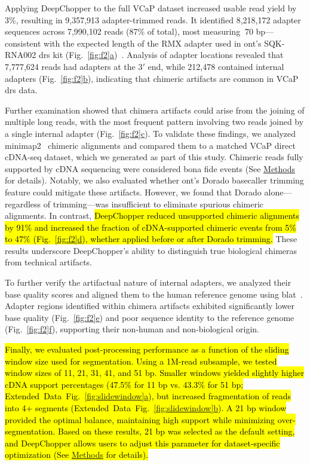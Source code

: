 \documentclass[pdflatex,sn-nature, lineno]{sn-jnl}%
\newcommand{\figref}[2]{Fig.~\hyperref[#1]{\ref*{#1}#2}}
\newcommand{\edfigref}[2]{Extended Data Fig.~\hyperref[#1]{\ref*{#1}#2}}
\begin{document}
Applying DeepChopper to the full VCaP dataset increased usable read yield by 3\%, resulting in 9,357,913 adapter-trimmed reads. It identified 8,218,172 adapter sequences across 7,990,102 reads (87\% of total), most measuring $~70$ bp—consistent with the expected length of the RMX adapter used in \gls{ont}'s SQK-RNA002 \gls{drs} kit (\figref{fig:f2}{a})~\cite{nano2017tech}. Analysis of adapter locations revealed that 7,777,624 reads had adapters at the $3'$ end, while 212,478 contained internal adapters (\figref{fig:f2}{b}), indicating that chimeric artifacts are common in VCaP \gls{drs} data.

Further examination showed that chimera artifacts could arise from the joining of multiple long reads, with the most frequent pattern involving two reads joined by a single internal adapter (\figref{fig:f2}{c}). To validate these findings, we analyzed minimap2~\cite{li2018minimap2} chimeric alignments and compared them to a matched VCaP direct cDNA-seq dataset, which we generated as part of this study. Chimeric reads fully supported by cDNA sequencing were considered bona fide events (See \hyperref[sec:methods]{Methods} for details). Notably, we also evaluated whether \gls{ont}'s Dorado basecaller trimming feature could mitigate these artifacts.
However, we found that Dorado alone—regardless of trimming—was insufficient to eliminate spurious chimeric alignments.
In contrast, \hl{DeepChopper reduced unsupported chimeric alignments by 91\% and increased the fraction of cDNA-supported chimeric events from 5\% to 47\% (\mbox{\figref{fig:f2}{d}}), whether applied before or after Dorado trimming.} 
These results underscore DeepChopper’s ability to distinguish true biological chimeras from technical artifacts.

To further verify the artifactual nature of internal adapters, we analyzed their base quality scores and aligned them to the human reference genome using \gls{blat}~\cite{kent2002blat}. Adapter regions identified within chimera artifacts exhibited significantly lower base quality (\figref{fig:f2}{e}) and poor sequence identity to the reference genome (\figref{fig:f2}{f}), supporting their non-human and non-biological origin.

\hl{Finally, we evaluated post-processing performance as a function of the sliding window size used for segmentation. Using a 1M-read subsample, we tested window sizes of 11, 21, 31, 41, and 51 bp. Smaller windows yielded slightly higher cDNA support percentages (47.5\% for 11 bp vs. 43.3\% for 51 bp; \mbox{\edfigref{fig:slidewindow}{a}}), but increased fragmentation of reads into 4+ segments (\mbox{\edfigref{fig:slidewindow}{b}}). A 21 bp window provided the optimal balance, maintaining high support while minimizing over-segmentation. Based on these results, 21 bp was selected as the default setting, and DeepChopper allows users to adjust this parameter for dataset-specific optimization (See \mbox{\hyperref[sec:methods]{Methods}} for details).}
\end{document}
